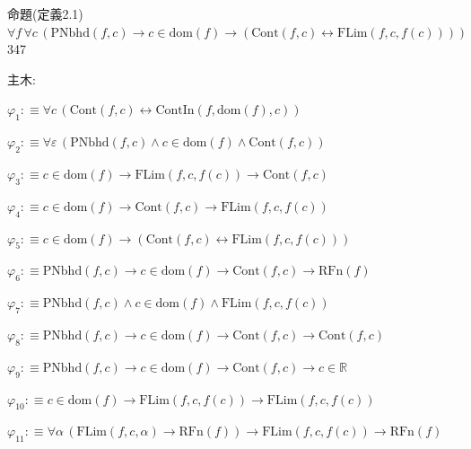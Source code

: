 \begin{fullproof}{命題(定義2.1)}{$\forall f\,\forall c\,(\mathrm{PNbhd}(f,c) \to c \in \mathrm{dom}(f) \to (\mathrm{Cont}(f,c) \leftrightarrow \mathrm{FLim}(f,c,f(c))))$}{347}
\begin{ptree}
\end{ptree}
\noindent 主木:
\begin{ptree}
\noLine
{}
\noLine
{}
\noLine
{}
\end{ptree}
\begin{abbrevlist}
\item $\varphi_{1} :\equiv \forall c\,(\mathrm{Cont}(f,c) \leftrightarrow \mathrm{ContIn}(f,\mathrm{dom}(f),c))$
\item $\varphi_{2} :\equiv \forall \varepsilon\,(\mathrm{PNbhd}(f,c) \land c \in \mathrm{dom}(f) \land \mathrm{Cont}(f,c))$
\item $\varphi_{3} :\equiv c \in \mathrm{dom}(f) \to \mathrm{FLim}(f,c,f(c)) \to \mathrm{Cont}(f,c)$
\item $\varphi_{4} :\equiv c \in \mathrm{dom}(f) \to \mathrm{Cont}(f,c) \to \mathrm{FLim}(f,c,f(c))$
\item $\varphi_{5} :\equiv c \in \mathrm{dom}(f) \to (\mathrm{Cont}(f,c) \leftrightarrow \mathrm{FLim}(f,c,f(c)))$
\item $\varphi_{6} :\equiv \mathrm{PNbhd}(f,c) \to c \in \mathrm{dom}(f) \to \mathrm{Cont}(f,c) \to \mathrm{RFn}(f)$
\item $\varphi_{7} :\equiv \mathrm{PNbhd}(f,c) \land c \in \mathrm{dom}(f) \land \mathrm{FLim}(f,c,f(c))$
\item $\varphi_{8} :\equiv \mathrm{PNbhd}(f,c) \to c \in \mathrm{dom}(f) \to \mathrm{Cont}(f,c) \to \mathrm{Cont}(f,c)$
\item $\varphi_{9} :\equiv \mathrm{PNbhd}(f,c) \to c \in \mathrm{dom}(f) \to \mathrm{Cont}(f,c) \to c \in \mathbb{R}$
\item $\varphi_{10} :\equiv c \in \mathrm{dom}(f) \to \mathrm{FLim}(f,c,f(c)) \to \mathrm{FLim}(f,c,f(c))$
\item $\varphi_{11} :\equiv \forall \alpha\,(\mathrm{FLim}(f,c,\alpha) \to \mathrm{RFn}(f)) \to \mathrm{FLim}(f,c,f(c)) \to \mathrm{RFn}(f)$

\end{abbrevlist}
\end{fullproof}
